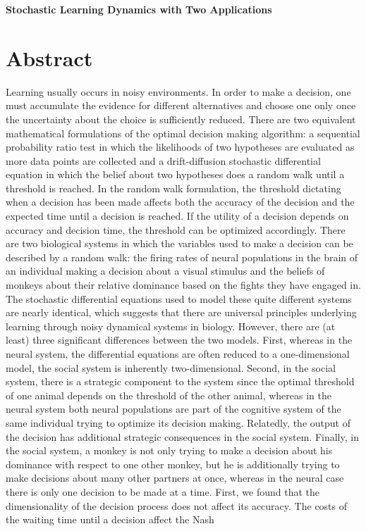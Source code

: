 \documentclass{article}
\begin{document}
\begin{center}
\Large

\end{center}


\vspace{0pt}

\begin{center}
{\bf \LARGE{Stochastic Learning Dynamics with Two Applications}}
\end{center}

\tableofcontents

\section{Abstract}
Learning usually occurs in noisy environments.  In order to make a decision, one must accumulate the  evidence for different alternatives and choose one only once the uncertainty about the choice is sufficiently reduced.  There are two equivalent mathematical formulations of the optimal decision making algorithm: a sequential probability ratio test in which the likelihoods of two hypotheses are evaluated as more data points are collected and a drift-diffusion stochastic differential equation in which the belief about two hypotheses does a random walk until a threshold is reached.  In the random walk formulation, the threshold dictating when a decision has been made affects both the accuracy of the decision and the expected time until a decision is reached.  If the utility of a decision depends on accuracy and decision time, the threshold can be optimized accordingly.  There are two biological systems in which the variables used to make a decision can be described by a random walk: the firing rates of neural populations in the brain of an individual making a decision about a visual stimulus and the beliefs of monkeys about their relative dominance based on the fights they have engaged in.  The stochastic differential equations used to model these quite different systems are nearly identical, which suggests that there are universal principles underlying learning through noisy dynamical systems in biology.  However, there are (at least) three significant differences between the two models.  First, whereas in the neural system, the differential equations are often reduced to a one-dimensional model, the social system is inherently two-dimensional.  Second, in the social system, there is a strategic component to the system since the optimal threshold of one animal depends on the threshold of the other animal, whereas in the neural system both neural populations are part of the cognitive system of the same individual trying to optimize its decision making.  Relatedly, the output of the decision has additional strategic consequences in the social system.    Finally, in the social system, a monkey is not only trying to make a decision about his dominance with respect to one other monkey, but he is additionally trying to make decisions about many other partners at once, whereas in the neural case there is only one decision to be made at a time.  First, we found that the dimensionality of the decision process does not affect its accuracy.  The costs of the waiting time until a decision affect the Nash 
\end{document}
